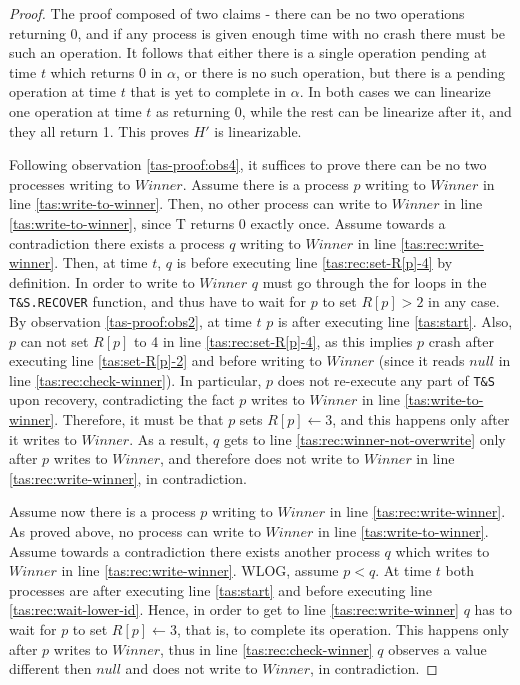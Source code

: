 \begin{proof}
	
	The proof composed of two claims - there can be no two operations returning 0, and if any process is given enough time with no crash there must be such an operation. It follows that either there is a single operation pending at time $t$ which returns 0 in $\alpha$, or there is no such operation, but there is a pending operation at time $t$ that is yet to complete in $\alpha$. In both cases we can linearize one operation at time $t$ as returning 0, while the rest can be linearize after it, and they all return 1. This proves $H'$ is linearizable.
	
	Following observation \ref{tas-proof:obs4}, it suffices to prove there can be no two processes writing to $Winner$.
	Assume there is a process $p$ writing to $Winner$ in line \ref{tas:write-to-winner}. Then, no other process can write to $Winner$ in line \ref{tas:write-to-winner}, since T returns 0 exactly once.
	Assume towards a contradiction there exists a process $q$ writing to $Winner$ in line \ref{tas:rec:write-winner}. Then, at time $t$, $q$ is before executing line \ref{tas:rec:set-R[p]-4} by definition. In order to write to $Winner$ $q$ must go through the for loops in the \texttt{T\&S.RECOVER} function, and thus have to wait for $p$ to set $R[p] > 2$ in any case. By observation \ref{tas-proof:obs2}, at time $t$ $p$ is after executing line \ref{tas:start}. Also, $p$ can not set $R[p]$ to 4 in line \ref{tas:rec:set-R[p]-4}, as this implies $p$ crash after executing line \ref{tas:set-R[p]-2} and before writing to $Winner$ (since it reads $null$ in line \ref{tas:rec:check-winner}). In particular, $p$ does not re-execute any part of \texttt{T\&S} upon recovery, contradicting the fact $p$ writes to $Winner$ in line \ref{tas:write-to-winner}. Therefore, it must be that $p$ sets $R[p] \gets 3$, and this happens only after it writes to $Winner$. As a result, $q$ gets to line \ref{tas:rec:winner-not-overwrite} only after $p$ writes to $Winner$, and therefore does not write to $Winner$ in line \ref{tas:rec:write-winner}, in contradiction.
	
	Assume now there is a process $p$ writing to $Winner$ in line \ref{tas:rec:write-winner}. As proved above, no process can write to $Winner$ in line \ref{tas:write-to-winner}. Assume towards a contradiction there exists another process $q$ which writes to $Winner$ in line \ref{tas:rec:write-winner}. WLOG, assume $p < q$. At time $t$ both processes are after executing line \ref{tas:start} and before executing line \ref{tas:rec:wait-lower-id}. Hence, in order to get to line \ref{tas:rec:write-winner} $q$ has to wait for $p$ to set $R[p] \gets 3$, that is, to complete its operation. This happens only after $p$ writes to $Winner$, thus in line \ref{tas:rec:check-winner} $q$ observes a value different then $null$ and does not write to $Winner$, in contradiction.
	

\end{proof}

